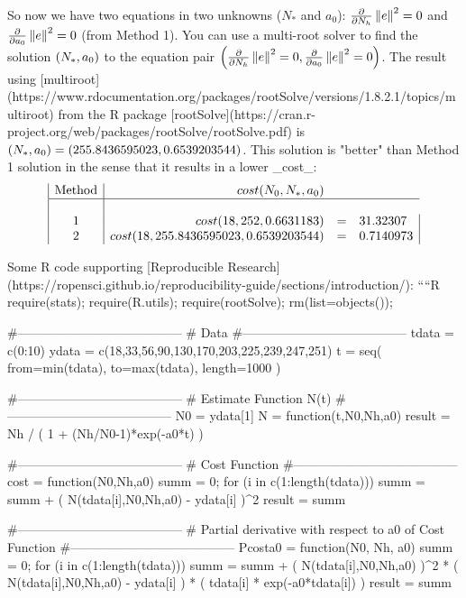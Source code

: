 So now we have two equations in two unknowns ($N_*$ and $a_0$): ${\frac{\partial}{\partial N_h} }\left\lVert e \right\rVert^2=0$ and ${\frac{\partial}{\partial a_0} }\left\lVert e \right\rVert^2=0$ (from Method 1).
You can use a multi-root solver to find the solution $\left( N_*,a_0\right)$ to the equation pair
$\left( {\frac{\partial}{\partial N_h} }\left\lVert e \right\rVert^2=0,{\frac{\partial}{\partial a_0} }\left\lVert e \right\rVert^2=0\right)$.
The result using [multiroot](https://www.rdocumentation.org/packages/rootSolve/versions/1.8.2.1/topics/multiroot)
from the R package [rootSolve](https://cran.r-project.org/web/packages/rootSolve/rootSolve.pdf)
is $\left( N_*,a_0\right)=\left( 255.8436595023,0.6539203544\right)$.
This solution is "better" than Method 1 solution in the sense that it results in a lower _cost_:
$$\begin{array}{|c|rcl|}
  \text{Method} & cost(N_0,N_*,a_0)
\\\hline
\\1             & cost(18,252,0.6631183) &=& 31.32307
\\2             & cost(18,255.8436595023,0.6539203544) &=& 0.7140973
\end{array}$$



Some R code supporting [Reproducible Research](https://ropensci.github.io/reproducibility-guide/sections/introduction/):
````R
 require(stats);
 require(R.utils);
 require(rootSolve);
 rm(list=objects());

#---------------------------------------
# Data
#---------------------------------------
 tdata = c(0:10)
 ydata = c(18,33,56,90,130,170,203,225,239,247,251)
 t     = seq( from=min(tdata), to=max(tdata), length=1000 )

#---------------------------------------
# Estimate Function N(t)
#---------------------------------------
 N0 = ydata[1]
 N = function(t,N0,Nh,a0)
 {
   result = Nh / ( 1 + (Nh/N0-1)*exp(-a0*t) )
 }

#---------------------------------------
# Cost Function
#---------------------------------------
 cost = function(N0,Nh,a0)
 {
   summ = 0;
   for (i in c(1:length(tdata)))
   {
     summ = summ + ( N(tdata[i],N0,Nh,a0) - ydata[i] )^2
   }
   result = summ
 }

#---------------------------------------
# Partial derivative with respect to a0 of Cost Function
#---------------------------------------
 Pcosta0 = function(N0, Nh, a0)
 {
   summ = 0;
   for (i in c(1:length(tdata)))
   {
     summ = summ + ( N(tdata[i],N0,Nh,a0) )^2 *
                   ( N(tdata[i],N0,Nh,a0) - ydata[i] ) *
                   ( tdata[i] * exp(-a0*tdata[i]) )
   }
   result = summ
 }

